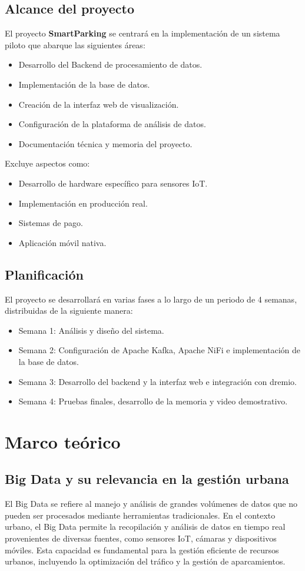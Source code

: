 \documentclass{../../../miPlantilla}
\begin{document}
\subsection{Alcance del proyecto}
El proyecto \textbf{SmartParking} se centrará en la implementación de un sistema piloto que abarque las siguientes
áreas:
\begin{itemize}
  \item Desarrollo del Backend de procesamiento de datos.
  \item Implementación de la base de datos.
  \item Creación de la interfaz web de visualización.
  \item Configuración de la plataforma de análisis de datos.
  \item Documentación técnica y memoria del proyecto.
\end{itemize}

Excluye aspectos como:
\begin{itemize}
  \item Desarrollo de hardware específico para sensores IoT.
  \item Implementación en producción real.
  \item Sistemas de pago.
  \item Aplicación móvil nativa.
\end{itemize}

\subsection{Planificación}
El proyecto se desarrollará en varias fases a lo largo de un periodo de 4 semanas, distribuidas de la siguiente manera:
\begin{itemize}
  \item Semana 1: Análisis y diseño del sistema.
  \item Semana 2: Configuración de Apache Kafka, Apache NiFi e implementación de la base de datos.
  \item Semana 3: Desarrollo del backend y la interfaz web e integración con dremio.
  \item Semana 4: Pruebas finales, desarrollo de la memoria y video demostrativo.
\end{itemize}

\section{Marco teórico}
\subsection{Big Data y su relevancia en la gestión urbana}
El Big Data se refiere al manejo y análisis de grandes volúmenes de datos que no pueden ser procesados mediante
herramientas tradicionales. En el contexto urbano, el Big Data permite la recopilación y análisis de datos en tiempo real
provenientes de diversas fuentes, como sensores IoT, cámaras y dispositivos móviles. Esta capacidad es fundamental para
la gestión eficiente de recursos urbanos, incluyendo la optimización del tráfico y la gestión de aparcamientos.
\end{document}
